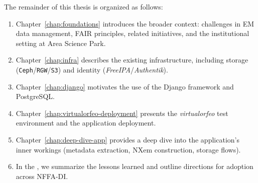 \medskip
\noindent The remainder of this thesis is organized as follows:
\begin{enumerate}
	\item Chapter~\ref{chap:foundations} introduces the broader context: challenges in EM data management, FAIR principles, related initiatives, and the institutional setting at Area Science Park. 
	\item Chapter~\ref{chap:infra} describes the existing infrastructure, including storage (\texttt{Ceph}/\texttt{RGW}/\texttt{S3}) and identity (\textit{FreeIPA}/\textit{Authentik}). 
	\item Chapter~\ref{chap:django} motivates the use of the Django framework and PostgreSQL. 
	\item Chapter~\ref{chap:virtualorfeo-deployment} presents the \textit{virtualorfeo} test environment and the application deployment. 
	\item Chapter~\ref{chap:deep-dive-app} provides a deep dive into the application’s inner workings (metadata extraction, NXem construction, storage flows). 
	\item In the , we summarize the lessons learned and outline directions for adoption across NFFA-DI.
\end{enumerate}

